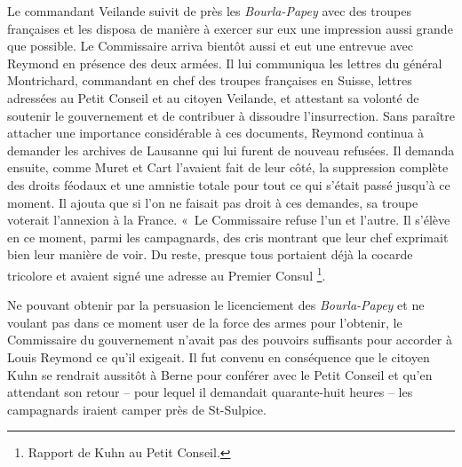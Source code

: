 \documentclass[french,twoside]{book} %
\begin{document}
Le commandant Veilande suivit de près les \emph{Bourla-Papey} avec des troupes françaises et les disposa de manière à exercer sur eux une impression aussi grande que possible. Le Commissaire arriva bientôt aussi et eut une entrevue avec Reymond en présence des deux armées. Il lui communiqua les lettres du général Montrichard, commandant en chef des troupes françaises en Suisse, lettres adressées au Petit Conseil et au citoyen Veilande, et attestant sa volonté de soutenir le gouvernement et de contribuer à dissoudre l’insurrection. Sans paraître attacher une importance considérable à ces documents, Reymond continua à demander les archives de Lausanne qui lui furent de nouveau refusées. Il demanda ensuite, comme Muret et Cart l’avaient fait de leur côté, la suppression complète des droits féodaux et une amnistie totale pour tout ce qui s’était passé jusqu’à ce moment. Il ajouta que si l’on ne faisait pas droit à ces demandes, sa troupe voterait l’annexion à la France. « Le Commissaire refuse l’un et l’autre. Il s’élève en ce moment, parmi les campagnards, des cris montrant que leur chef exprimait bien leur manière de voir. Du reste, presque tous portaient déjà la cocarde tricolore et avaient signé une adresse au Premier Consul \footnote{Rapport de Kuhn au Petit Conseil.}.\par
Ne pouvant obtenir par la persuasion le licenciement des \emph{Bourla-Papey} et ne voulant pas dans ce moment user de la force des armes pour l’obtenir, le Commissaire du gouvernement n’avait pas des pouvoirs suffisants pour accorder à Louis Reymond ce qu’il exigeait. Il fut convenu en conséquence que le citoyen Kuhn se rendrait aussitôt à Berne pour conférer avec le Petit Conseil et qu’en attendant son retour – pour lequel il demandait quarante-huit heures – les campagnards iraient camper près de St-Sulpice.
\end{document}
